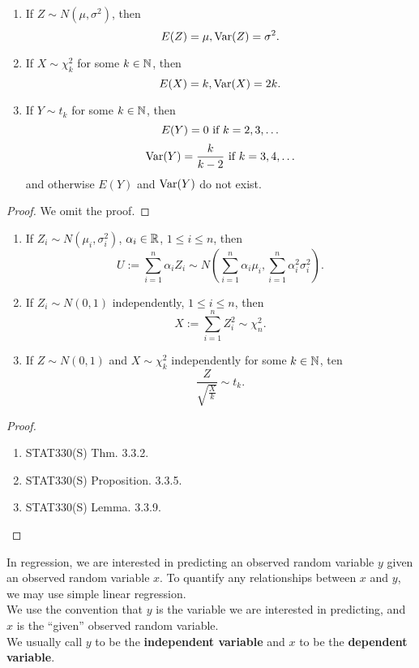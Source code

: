 \documentclass[11pt,fleqn]{book} %
\begin{document}
\begin{proposition} \label{prop:116}
\begin{enumerate}
\item If \(Z \sim N(\mu, \sigma^2)\), then
\[
E(Z) = \mu, \operatorname{Var}(Z) = \sigma^2.
\]
\item If \(X \sim \chi^2_k\) for some \(k \in \mathbb{N}\), then
\[
E(X) = k, \operatorname{Var}(X) = 2k.
\]
\item If \(Y \sim t_k\) for some \(k \in \mathbb{N}\), then
\[
E(Y) = 0 \text{ if } k = 2, 3, \ldots
\]
\[
\operatorname{Var}(Y) = \frac{k}{k - 2} \text{ if } k = 3, 4, \ldots
\]
and otherwise \(E(Y)\) and \(\operatorname{Var}(Y)\) do not exist.
\end{enumerate}
\end{proposition}
\begin{proof} We omit the proof.\end{proof}

\begin{proposition} \label{prop:117}
\begin{enumerate}
\item If \(Z_i \sim N(\mu_i, \sigma_i^2)\), \(\alpha_i \in \mathbb{R}\), \(1 \leq i \leq n\), then
\[
U := \sum_{i=1}^n \alpha_iZ_i \sim N\left(\sum_{i=1}^n\alpha_i\mu_i, \sum_{i=1}^n\alpha_i^2\sigma_i^2\right).
\]
\item If \(Z_i \sim N(0, 1)\) independently, \(1 \leq i \leq n\), then
\[
X := \sum_{i=1}^n Z_i^2 \sim \chi^2_n.
\]
\item If \(Z \sim N(0, 1)\) and \(X \sim \chi^2_k\) independently for some \(k \in \mathbb{N}\), ten
\[
\frac{Z}{\sqrt{\frac{X}{k}}} \sim t_k.
\]
\end{enumerate}
\end{proposition}
\begin{proof}
\begin{enumerate}
\item STAT330(S) Thm. 3.3.2.
\item STAT330(S) Proposition. 3.3.5.
\item STAT330(S) Lemma. 3.3.9.
\end{enumerate}
\end{proof}

\begin{remark} \label{rmk:118}
In regression, we are interested in predicting an observed random variable \(y\) given an observed random variable \(x\). To quantify any relationships between \(x\) and \(y\), we may use simple linear regression. \\
\indent We use the convention that \(y\) is the variable we are interested in predicting, and \(x\) is the ``given'' observed random variable. \\
\indent We usually call \(y\) to be the \textbf{independent variable} and \(x\) to be the \textbf{dependent variable}.
\end{remark}
\end{document}
